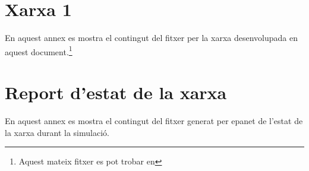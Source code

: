 \documentclass[12pt]{article}
\begin{document}
\clearpage
\begin{appendices}
\section{Xarxa 1\label{ann1}}
En aquest annex es mostra el contingut del fitxer per la xarxa desenvolupada en aquest document.\footnote{Aquest mateix fitxer es pot trobar en }


\section{Report d'estat de la xarxa\label{ann2}}
En aquest annex es mostra el contingut del fitxer generat per epanet de l'estat de la xarxa durant la simulació.

\end{appendices}
\end{document}
